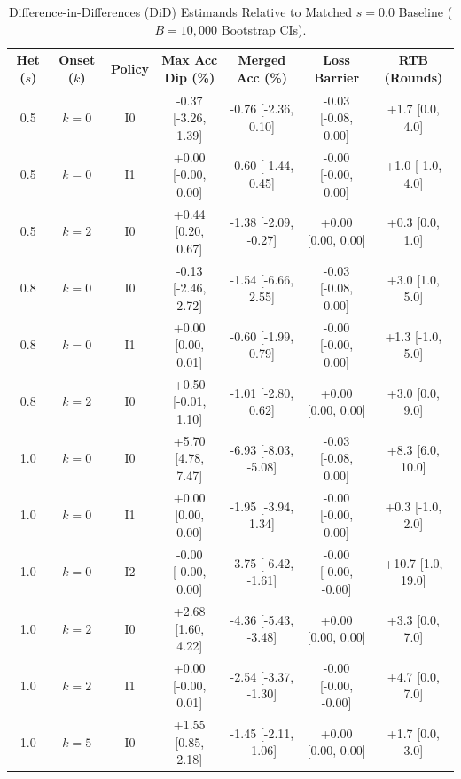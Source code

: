 \begin{table}[t]
\centering
\small
\caption{Difference-in-Differences (DiD) Estimands Relative to Matched $s=0.0$ Baseline ($B=10,000$ Bootstrap CIs).}
\label{tab:did_summary}
\begin{tabular}{ccccccc}
\toprule
\textbf{Het ($s$)} & \textbf{Onset ($k$)} & \textbf{Policy} & \textbf{Max Acc Dip (\%)} & \textbf{Merged Acc (\%)} & \textbf{Loss Barrier} & \textbf{RTB (Rounds)} \\
\midrule
0.5 & $k=0$ & I0 & -0.37 \tiny{[-3.26, 1.39]} & -0.76 \tiny{[-2.36, 0.10]} & -0.03 \tiny{[-0.08, 0.00]} & +1.7 \tiny{[0.0, 4.0]} \\
0.5 & $k=0$ & I1 & +0.00 \tiny{[-0.00, 0.00]} & -0.60 \tiny{[-1.44, 0.45]} & -0.00 \tiny{[-0.00, 0.00]} & +1.0 \tiny{[-1.0, 4.0]} \\
0.5 & $k=2$ & I0 & +0.44 \tiny{[0.20, 0.67]} & -1.38 \tiny{[-2.09, -0.27]} & +0.00 \tiny{[0.00, 0.00]} & +0.3 \tiny{[0.0, 1.0]} \\
0.8 & $k=0$ & I0 & -0.13 \tiny{[-2.46, 2.72]} & -1.54 \tiny{[-6.66, 2.55]} & -0.03 \tiny{[-0.08, 0.00]} & +3.0 \tiny{[1.0, 5.0]} \\
0.8 & $k=0$ & I1 & +0.00 \tiny{[0.00, 0.01]} & -0.60 \tiny{[-1.99, 0.79]} & -0.00 \tiny{[-0.00, 0.00]} & +1.3 \tiny{[-1.0, 5.0]} \\
0.8 & $k=2$ & I0 & +0.50 \tiny{[-0.01, 1.10]} & -1.01 \tiny{[-2.80, 0.62]} & +0.00 \tiny{[0.00, 0.00]} & +3.0 \tiny{[0.0, 9.0]} \\
1.0 & $k=0$ & I0 & +5.70 \tiny{[4.78, 7.47]} & -6.93 \tiny{[-8.03, -5.08]} & -0.03 \tiny{[-0.08, 0.00]} & +8.3 \tiny{[6.0, 10.0]} \\
1.0 & $k=0$ & I1 & +0.00 \tiny{[0.00, 0.00]} & -1.95 \tiny{[-3.94, 1.34]} & -0.00 \tiny{[-0.00, 0.00]} & +0.3 \tiny{[-1.0, 2.0]} \\
1.0 & $k=0$ & I2 & -0.00 \tiny{[-0.00, 0.00]} & -3.75 \tiny{[-6.42, -1.61]} & -0.00 \tiny{[-0.00, -0.00]} & +10.7 \tiny{[1.0, 19.0]} \\
1.0 & $k=2$ & I0 & +2.68 \tiny{[1.60, 4.22]} & -4.36 \tiny{[-5.43, -3.48]} & +0.00 \tiny{[0.00, 0.00]} & +3.3 \tiny{[0.0, 7.0]} \\
1.0 & $k=2$ & I1 & +0.00 \tiny{[-0.00, 0.01]} & -2.54 \tiny{[-3.37, -1.30]} & -0.00 \tiny{[-0.00, -0.00]} & +4.7 \tiny{[0.0, 7.0]} \\
1.0 & $k=5$ & I0 & +1.55 \tiny{[0.85, 2.18]} & -1.45 \tiny{[-2.11, -1.06]} & +0.00 \tiny{[0.00, 0.00]} & +1.7 \tiny{[0.0, 3.0]} \\
\bottomrule
\end{tabular}
\end{table}
